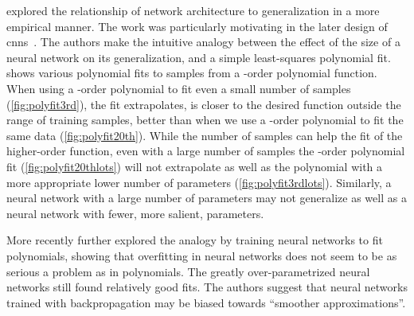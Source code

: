 \documentclass[thesis]{subfiles}
\begin{document}
	\citet{denker1987large} explored the relationship of network architecture to generalization in a more empirical manner. The work was particularly motivating in the later design of \glspl{cnn}~\citep{lecun1989generalization, lecun1989backpropagation}. The authors make the intuitive analogy between the effect of the size of a neural network on its generalization, and a simple least-squares polynomial fit.  shows various polynomial fits to samples from a -order polynomial function. When using a -order polynomial to fit even a small number of samples (\cref{fig:polyfit3rd}), the fit extrapolates, \ie is closer to the desired function outside the range of training samples, better than when we use a -order polynomial to fit the same data (\cref{fig:polyfit20th}). While the number of samples can help the fit of the higher-order function, even with a large number of samples the -order polynomial fit  (\cref{fig:polyfit20thlots}) will not extrapolate as well as the polynomial with a more appropriate lower number of parameters (\cref{fig:polyfit3rdlots}). Similarly, a neural network with a large number of parameters may not generalize as well as a neural network with fewer, more salient, parameters.
    
    More recently \citet{caruana2001overfitting} further explored the analogy by training neural networks to fit polynomials, showing that overfitting in neural networks does not seem to be as serious a problem as in polynomials. The greatly over-parametrized neural networks still found relatively good fits. The authors suggest that neural networks trained with backpropagation may be biased towards ``smoother approximations''.
	
	
\end{document}
